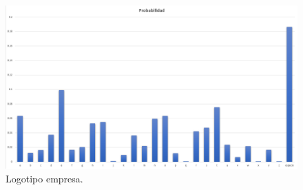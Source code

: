 \documentclass[12pt,letterpaper]{article}
\begin{document}
\\
\begin{figure}[ht]
    \centering
    \includegraphics[width=1\textwidth]{ingleSinMemProp.PNG}
    \caption{Logotipo empresa.}
\end{figure}
\end{document}
